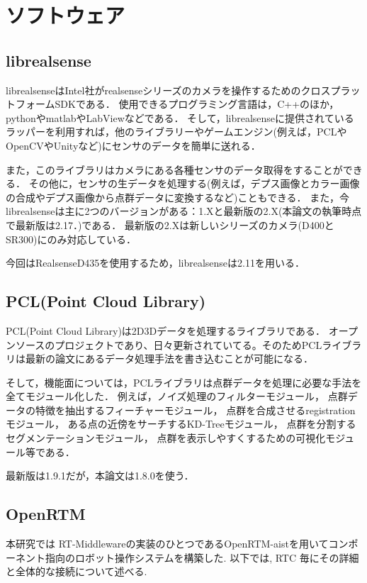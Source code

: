 \section{ソフトウェア}
	\subsection{librealsense}
	librealsenseはIntel社がrealsenseシリーズのカメラを操作するためのクロスプラットフォームSDKである．
	使用できるプログラミング言語は，C++のほか，pythonやmatlabやLabViewなどである．
	そして，librealsenseに提供されているラッパーを利用すれば，他のライブラリーやゲームエンジン(例えば，PCLやOpenCVやUnityなど)にセンサのデータを簡単に送れる．
	
	また，このライブラリはカメラにある各種センサのデータ取得をすることができる．
	その他に，センサの生データを処理する(例えば，デプス画像とカラー画像の合成やデプス画像から点群データに変換するなど)こともできる．
	また，今librealsenseは主に2つのバージョンがある：1.Xと最新版の2.X(本論文の執筆時点で最新版は2.17．)である．
	最新版の2.Xは新しいシリーズのカメラ(D400とSR300)にのみ対応している．
	
	
	今回はRealsenseD435を使用するため，librealsenseは2.11を用いる．
	
	\subsection{PCL(Point Cloud Library)}\label{sec:pcl}
	PCL(Point Cloud Library)は2D3Dデータを処理するライブラリである．
	オープンソースのプロジェクトであり、日々更新されていてる。そのためPCLライブラリは最新の論文にあるデータ処理手法を書き込むことが可能になる．
	
	そして，機能面については，PCLライブラリは点群データを処理に必要な手法を全てモジュール化した．
	例えば，ノイズ処理のフィルターモジュール，
	点群データの特徴を抽出するフィーチャーモジュール，
	点群を合成させるregistrationモジュール，
	ある点の近傍をサーチするKD-Treeモジュール，
	点群を分割するセグメンテーションモジュール，
	点群を表示しやすくするための可視化モジュール等である．
	
	最新版は1.9.1だが，本論文は1.8.0を使う．
	
	\subsection{OpenRTM}
	本研究では RT-Middlewareの実装のひとつであるOpenRTM-aist\cite{RTM-aist}を用いてコンポーネント指向のロボット操作システムを構築した.
	以下では, RTC 毎にその詳細と全体的な接続について述べる.
		
